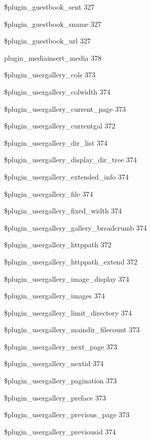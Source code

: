\documentclass{book}
\renewcommand\subitem{\par}
\begin{document}
\begin{multicols}{2}
\begin{osp-index}
    \subitem \$plugin\_guestbook\_sent\hspace{1mm} 327
    \subitem \$plugin\_guestbook\_sname\hspace{1mm} 327
    \subitem \$plugin\_guestbook\_url\hspace{1mm} 327
    \subitem plugin\_mediainsert\_media\hspace{1mm} 378
    \subitem \$plugin\_usergallery\_cols\hspace{1mm} 373
    \subitem \$plugin\_usergallery\_colwidth\hspace{1mm} 374
    \subitem \$plugin\_usergallery\_current\_page\hspace{1mm} 373
    \subitem \$plugin\_usergallery\_currentgal\hspace{1mm} 372
    \subitem \$plugin\_usergallery\_dir\_list\hspace{1mm} 374
    \subitem \$plugin\_usergallery\_display\_dir\_tree\hspace{1mm} 374
    \subitem \$plugin\_usergallery\_extended\_info\hspace{1mm} 374
    \subitem \$plugin\_usergallery\_file\hspace{1mm} 374
    \subitem \$plugin\_usergallery\_fixed\_width\hspace{1mm} 374
    \subitem \$plugin\_usergallery\_gallery\_breadcrumb\hspace{1mm} 374
    \subitem \$plugin\_usergallery\_httppath\hspace{1mm} 372
    \subitem \$plugin\_usergallery\_httppath\_extend\hspace{1mm} 372
    \subitem \$plugin\_usergallery\_image\_display\hspace{1mm} 374
    \subitem \$plugin\_usergallery\_images\hspace{1mm} 374
    \subitem \$plugin\_usergallery\_limit\_directory\hspace{1mm} 374
    \subitem \$plugin\_usergallery\_maindir\_filecount\hspace{1mm} 373
    \subitem \$plugin\_usergallery\_next\_page\hspace{1mm} 373
    \subitem \$plugin\_usergallery\_nextid\hspace{1mm} 374
    \subitem \$plugin\_usergallery\_pagination\hspace{1mm} 373
    \subitem \$plugin\_usergallery\_preface\hspace{1mm} 373
    \subitem \$plugin\_usergallery\_previous\_page\hspace{1mm} 373
    \subitem \$plugin\_usergallery\_previousid\hspace{1mm} 374

\end{osp-index}
\end{multicols}
\end{document}
